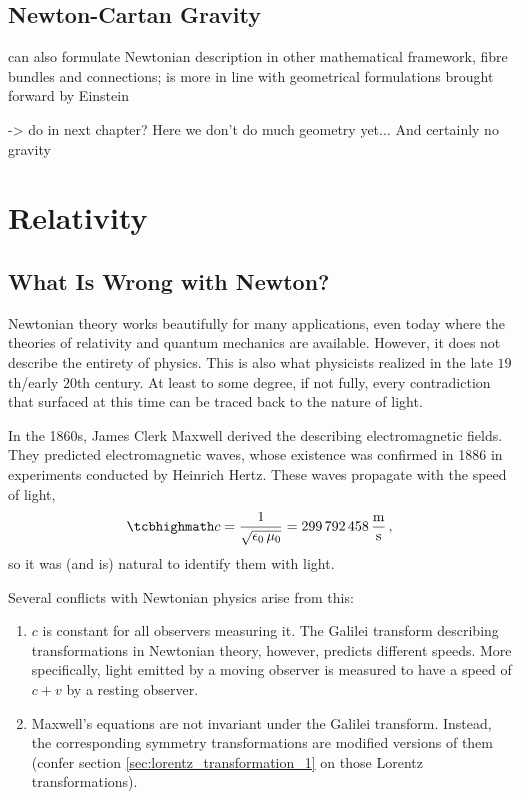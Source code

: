 		\subsection{Newton-Cartan Gravity}
can also formulate Newtonian description in other mathematical framework, fibre bundles and connections; is more in line with geometrical formulations brought forward by Einstein

-> do in next chapter? Here we don't do much geometry yet... And certainly no gravity

\fi



\newpage



	\section{Relativity}
		\subsection{What Is Wrong with Newton?}
Newtonian theory works beautifully for many applications, even today where the theories of relativity and quantum mechanics are available. However, it does not describe the entirety of physics. This is also what physicists realized in the late $19$th/early $20$th century. At least to some degree, if not fully, every contradiction that surfaced at this time can be traced back to the nature of light.

In the 1860s, James Clerk Maxwell derived the  describing electromagnetic fields. They predicted electromagnetic waves, whose existence was confirmed in 1886 in experiments conducted by Heinrich Hertz. These waves propagate with the speed of light,
\begin{equation}\label{eq:speed_of_light}
	\eqbox{
	c = \frac{1}{\sqrt{\epsilon_0 \, \mu_0}} = 299 \, 792 \, 458 \, \frac{\metre}{\second}
	} \, ,
\end{equation}
so it was (and is) natural to identify them with light.


Several conflicts with Newtonian physics arise from this:
\begin{enumerate}
	\item $c$ is constant for all observers measuring it. The Galilei transform describing transformations in Newtonian theory, however, predicts different speeds. More specifically, light emitted by a moving observer is measured to have a speed of $c + v$ by a resting observer.


	\item Maxwell's equations are not invariant under the Galilei transform. Instead, the corresponding symmetry transformations are modified versions of them (confer section \ref{sec:lorentz_transformation_1} on those Lorentz transformations).
\end{enumerate}

